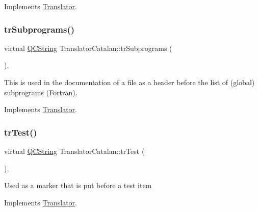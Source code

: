 Implements \mbox{\hyperlink{class_translator}{Translator}}.

\mbox{\label{class_translator_catalan_a1c260a132828f22c905f2d1f8fbc35f9}} 
\subsubsection{\texorpdfstring{trSubprograms()}{trSubprograms()}}
{\footnotesize\ttfamily virtual \mbox{\hyperlink{class_q_c_string}{Q\+C\+String}} Translator\+Catalan\+::tr\+Subprograms (\begin{DoxyParamCaption}{ }\end{DoxyParamCaption})\hspace{0.3cm}{\ttfamily [inline]}, {\ttfamily [virtual]}}

This is used in the documentation of a file as a header before the list of (global) subprograms (Fortran). 

Implements \mbox{\hyperlink{class_translator}{Translator}}.

\mbox{\label{class_translator_catalan_ac1fd6bd99007a34ed54fea44116d3cac}} 
\subsubsection{\texorpdfstring{trTest()}{trTest()}}
{\footnotesize\ttfamily virtual \mbox{\hyperlink{class_q_c_string}{Q\+C\+String}} Translator\+Catalan\+::tr\+Test (\begin{DoxyParamCaption}{ }\end{DoxyParamCaption})\hspace{0.3cm}{\ttfamily [inline]}, {\ttfamily [virtual]}}

Used as a marker that is put before a test item 

Implements \mbox{\hyperlink{class_translator}{Translator}}.

\mbox{\label{class_translator_catalan_a0e00596c7ed17d6bd35259c1b571384a}} 
